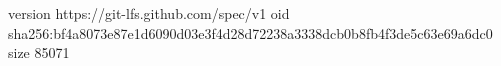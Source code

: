 version https://git-lfs.github.com/spec/v1
oid sha256:bf4a8073e87e1d6090d03e3f4d28d72238a3338dcb0b8fb4f3de5c63e69a6dc0
size 85071
